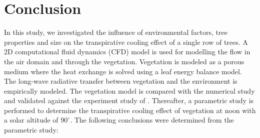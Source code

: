 \section{Conclusion}

In this study, we investigated the influence of environmental factors, tree properties and size on the transpirative cooling effect of a single row of trees. A 2D computational fluid dynamics (CFD) model is used for modelling the flow in the air domain and through the vegetation. Vegetation is modeled as a porous medium where the heat exchange is solved using a leaf energy balance model. The long-wave radiative transfer between vegetation and the environment is empirically modeled. The vegetation model is compared with the numerical study and validated against the experiment study of \cite{Kichah2012}. Thereafter, a parametric study is performed to determine the transpirative cooling effect of vegetation at noon with a solar altitude of $90^{\circ}$. The following conclusions were determined from the parametric study:

